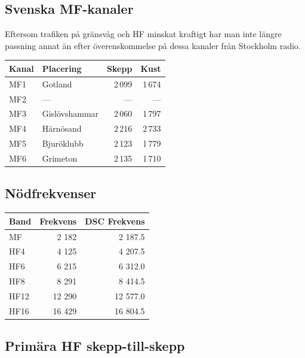 \subsection{Svenska MF-kanaler}

Eftersom trafiken på gränsvåg och HF minskat kraftigt har man inte längre
passning annat än efter överenskommelse på dessa kanaler från Stockholm radio.

\begin{longtable}{llrr}
\textbf{Kanal} & \textbf{Placering} & \textbf{Skepp} & \textbf{Kust}  \\ \hline
\endhead

MF1 & Gotland       & 2\,099 & 1\,674 \\
MF2 & ---           & ---  & ---   \\
MF3 & Gislövshammar & 2\,060 & 1\,797  \\
MF4 & Härnösand     & 2\,216 & 2\,733  \\
MF5 & Bjuröklubb    & 2\,123 & 1\,779  \\
MF6 & Grimeton      & 2\,135 & 1\,710
\end{longtable}

\subsection{Nödfrekvenser}

\begin{longtable}{lrr}
\textbf{Band} & \textbf{Frekvens} & \textbf{DSC Frekvens}\\ \hline \endhead

MF   & 2 182  & 2 187.5  \\
HF4  & 4 125  & 4 207.5  \\
HF6  & 6 215  & 6 312.0  \\
HF8  & 8 291  & 8 414.5  \\
HF12 & 12 290 & 12 577.0 \\
HF16 & 16 429 & 16 804.5 \\
\end{longtable}

\subsection{Primära HF skepp-till-skepp}

